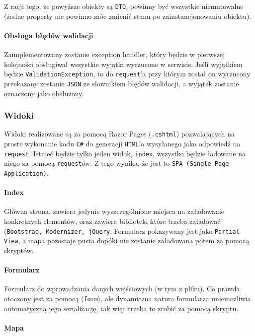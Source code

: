 \documentclass[a4paper, 10pt, titlepage]{article}
\newcommand{\code}[1]{\texttt{#1}}
\begin{document}
Z racji tego, że powyższe obiekty są \code{DTO}, powinny być wszystkie niemutowalne (żadne property nie powinno móc zmienić stanu po zainstancjonowaniu obiektu).

\paragraph{Obsługa błędów walidacji}

Zaimplementowany zostanie exception handler, który będzie w pierwszej kolejności obsługiwał wszystkie wyjątki wyrzucone w serwisie. Jeśli wyjątkiem będzie \code{ValidationException}, to do \code{request}'a przy którym został on wyrzucony przekazany zostanie \code{JSON} ze słownikiem błędów walidacji, a wyjątek zostanie oznaczony jako obsłużony.

\subsubsection{Widoki}

Widoki realizowane są za pomocą Razor Pages (\code{.cshtml}) pozwalających na proste wykonanie kodu \code{C\#} do generacji \code{HTML}'a wysyłanego jako odpowiedź na \code{request}.
Istnieć będzie tylko jeden widok, \code{index}, wszystko będzie ładowane na niego za pomocą \code{request}ów.
Z tego wynika, że jest to \code{SPA (Single Page Application)}.

\paragraph{Index}

Główna strona, zawiera jedynie wyszczególnione miejsca na załadowanie konkretnych elementów, oraz zawiera biblioteki które trzeba załadować (\code{Bootstrap, Modernizer, jQuery}.
Formularz pokazywany jest jako \code{Partial View}, a mapa pozostaje pusta dopóki nie zostanie załadowana potem za pomocą skryptów.

\paragraph{Formularz}

Formularz do wprowadzania danych wejściowych (w tym z pliku).
Co prawda otoczony jest za pomocą \code{$\langle$form$\rangle$}, ale dynamiczna natura formularza uniemożliwia automatyczną jego serializację, tak więc trzeba to zrobić za pomocą skryptu. 

\paragraph{Mapa}
\end{document}
